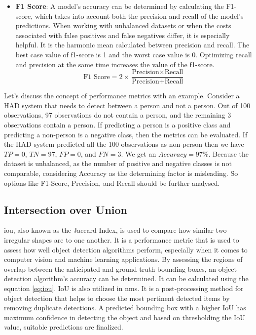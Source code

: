 \begin{itemize}
    \item \textbf{F1 Score}: A model's accuracy can be determined by calculating the F1-score, which takes into account both the precision and recall of the model's predictions. When working with unbalanced datasets or when the costs associated with false positives and false negatives differ, it is especially helpful. It is the harmonic mean calculated between precision and recall. The best case value of f1-score is 1 and the worst case value is 0. Optimizing recall and precision at the same time increases the value of the f1-score.
    \begin{equation}\label{eq:f1-score}
        \text{F1 Score} = 2 \times \frac{\text{Precision} \times \text{Recall}}{\text{Precision} + \text{Recall}}
    \end{equation}
\end{itemize}


Let's discuss the concept of performance metrics with an example. Consider a HAD system that needs to detect between a person and not a person. Out of 100 observations, 97 observations do not contain a person, and the remaining 3 observations contain a person. If predicting a person is a positive class and predicting a non-person is a negative class, then the metrics can be evaluated. If the HAD system predicted all the 100 observations as non-person then we have \(TP = 0\), \(TN = 97\), \(FP = 0\), and \(FN = 3\). We get an \(Accuracy = 97\%\). Because the dataset is unbalanced, as the number of positive and negative classes is not comparable, considering Accuracy as the determining factor is misleading. So options like F1-Score, Precision, and Recall should be further analysed.

\subsection{Intersection over Union}
\acrfull{iou}, also known as the Jaccard Index, is used to compare how similar two irregular shapes are to one another. It is a performance metric that is used to assess how well object detection algorithms perform, especially when it comes to computer vision and machine learning applications. By assessing the regions of overlap between the anticipated and ground truth bounding boxes, an object detection algorithm's accuracy can be determined. It can be calculated using the equation \ref{eq:iou}. IoU is also utilized in \acrfull{nms}. It is a post-processing method for object detection that helps to choose the most pertinent detected items by removing duplicate detections. A predicted bounding box with a higher IoU has maximum confidence in detecting the object and based on thresholding the IoU value, suitable predictions are finalized.


